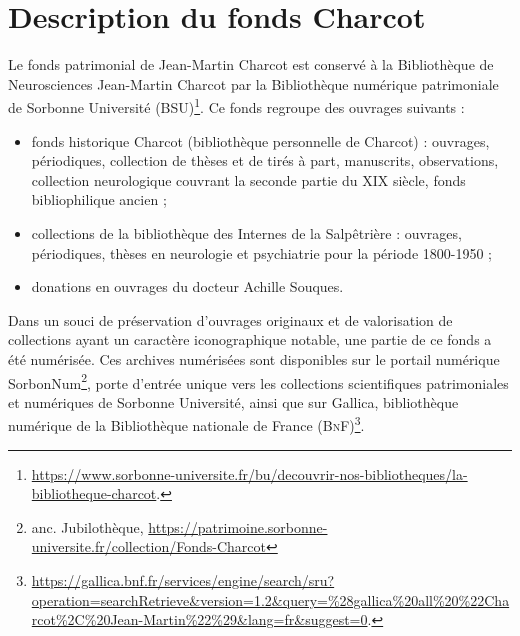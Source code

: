 \label{corpus}
\minitoc
\section{Description du fonds Charcot}
Le fonds patrimonial de Jean-Martin Charcot est conservé à la Bibliothèque de Neurosciences Jean-Martin Charcot par la Bibliothèque numérique patrimoniale de Sorbonne Université (BSU)\footnote{\url{https://www.sorbonne-universite.fr/bu/decouvrir-nos-bibliotheques/la-bibliotheque-charcot}.}. Ce fonds regroupe des ouvrages suivants : 
\begin{itemize}
\item fonds historique Charcot (bibliothèque personnelle de Charcot) : ouvrages, périodiques, collection de thèses et de tirés à part, manuscrits, observations, collection neurologique couvrant la seconde partie du XIX\ieme{} siècle, fonds bibliophilique ancien ;
\item collections de la bibliothèque des Internes de la Salpêtrière : ouvrages, périodiques, thèses en neurologie et psychiatrie pour la période 1800-1950 ;
\item donations en ouvrages du docteur Achille Souques.
\end{itemize}
\medskip
Dans un souci de préservation d'ouvrages originaux et de valorisation de collections ayant un caractère iconographique notable, une partie de ce fonds a été numérisée. Ces archives numérisées sont disponibles sur le portail numérique
SorbonNum\footnote{anc. Jubilothèque, \url{https://patrimoine.sorbonne-universite.fr/collection/Fonds-Charcot}}, porte d'entrée unique vers les collections scientifiques patrimoniales et numériques de Sorbonne Université, ainsi que sur Gallica, bibliothèque numérique de la Bibliothèque nationale de France (\textsc{BnF})\footnote{\url{https://gallica.bnf.fr/services/engine/search/sru?operation=searchRetrieve&version=1.2&query=\%28gallica\%20all\%20\%22Charcot\%2C\%20Jean-Martin\%22\%29&lang=fr&suggest=0}.}.

